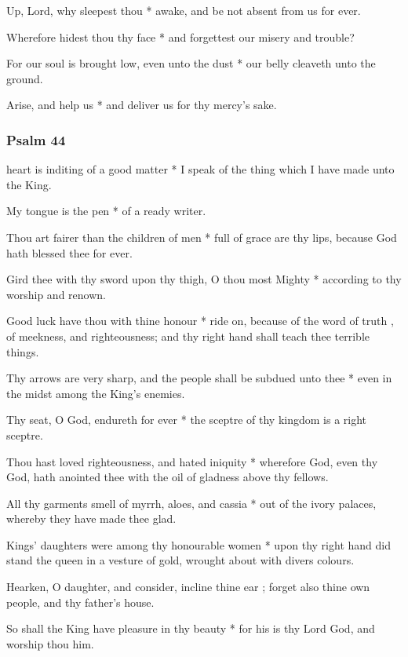 Up, Lord, why sleepest thou * awake, and be not absent from us for ever.

Wherefore hidest thou thy face * and forgettest our misery and trouble?

For our soul is brought low, even unto the dust * our belly cleaveth unto the ground.

Arise, and help us * and deliver us for thy mercy's sake.

\subsubsection{Psalm 44}


 heart is inditing of a good matter * I speak of the thing which I have made unto the King.

My tongue is the pen * of a ready writer.

Thou art fairer than the children of men * full of grace are thy lips, because God hath blessed thee for ever.

Gird thee with thy sword upon thy thigh, O thou most Mighty * according to thy worship and renown.

Good luck have thou with thine honour * ride on, because of the word of truth , of meekness, and righteousness; and thy right hand shall teach thee terrible things.

Thy arrows are very sharp, and the people shall be subdued unto thee * even in the midst among the King's enemies.

Thy seat, O God, endureth for ever * the sceptre of thy kingdom is a right sceptre.

Thou hast loved righteousness, and hated iniquity * wherefore God, even thy God, hath anointed thee with the oil of gladness above thy fellows.

All thy garments smell of myrrh, aloes, and cassia * out of the ivory palaces, whereby they have made thee glad.

Kings' daughters were among thy honourable women * upon thy right hand did stand the queen in a vesture of gold, wrought about with divers colours.

Hearken, O daughter, and consider, incline thine ear ; forget also thine own people, and thy father's house.

So shall the King have pleasure in thy beauty * for his is thy Lord God, and worship thou him.

